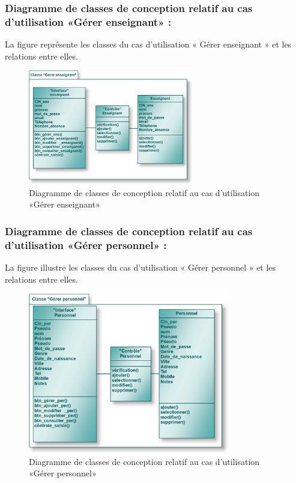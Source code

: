 \documentclass[12 pt ]{report}
\begin{document}
\subsubsection{Diagramme de classes de conception relatif au cas d’utilisation «Gérer enseignant» :}
La figure  représente les classes du cas d’utilisation « Gérer enseignant » et les relations entre elles.
\begin{figure}[h]
 \begin{center}
\includegraphics[width= 11 cm ,height= 5cm]{cl_ge.PNG}
\caption{Diagramme de classes de conception relatif au cas d’utilisation «Gérer enseignant»}

\end{center}
\end{figure}

\subsubsection{Diagramme de classes de conception relatif au cas d’utilisation «Gérer personnel» :}
La figure  illustre les classes du cas d’utilisation « Gérer personnel » et les relations entre elles.
\begin{figure}[h]
 \begin{center}
\includegraphics[width= 11 cm ,height=  7cm]{cl_gp.PNG}
\caption{Diagramme de classes de conception relatif au cas d’utilisation «Gérer personnel» }

\end{center}
\end{figure}
\end{document}
